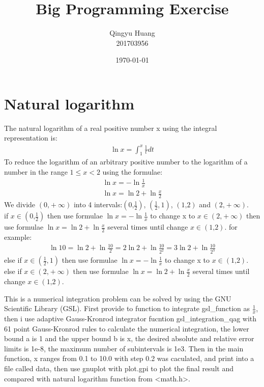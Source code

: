 \documentclass[oneside, 12pt, a4paper]{article}
\title{Big Programming Exercise}
\author{Qingyu Huang \\
201703956}
\date{\today}
\begin{document}
\maketitle

\section*{Natural logarithm}
%
The natural logarithm of a real positive number x using the integral representation is:
%
\begin{align}
    \ln x=\int_1^x{\frac{1}{t}dt}
\end{align}
%
To reduce the logarithm of an arbitrary positive number to the logarithm of a number in the range $1\leqslant x<2$ using the formulae:
%
\begin{align}
    \ln x=-\ln \frac{1}{x} \\
    \ln x=\ln 2+\ln \frac{x}{2}
\end{align}
We divide $(\text{0,}+\infty) $ into 4 intervals:$(\text{0,}\frac{1}{2}) $, $(\frac{1}{2},1) $, $(\text{1,}2) $ and $(\text{2,}+\infty)$.\\
if $x\in (\text{0,}\frac{1}{2})$ then use formulae $\ln x=-\ln \frac{1}{x}$ to change x to $x \in (\text{2,}+\infty) $ then use formulae $\ln x=\ln 2+\ln \frac{x}{2}$ several times until change $x \in (\text{1,}2) $. for example:
\begin{align}
    \ln 10=\ln 2+\ln \frac{10}{2}=  2\ln 2+\ln \frac{10}{2^2}=  3 \ln2 + \ln \frac{10}{2^3}
\end{align}
else if $x\in (\frac{1}{2},1)$ then use formulae $\ln x=-\ln \frac{1}{x}$ to change x to $x \in (\text{1,}2)$.\\
else if $x\in (\text{2,}+\infty)$ then use formulae $\ln x=\ln 2+\ln \frac{x}{2}$ several times until change $x \in (\text{1,}2) $.


This is a numerical integration problem can be solved by using the GNU Scientific Library (GSL). First provide to function to integrate gsl\_function as $\frac{1}{x}$, then i use adaptive Gauss-Kronrod integrator fucntion gsl\_integration\_qag with 61 point Gauss-Kronrod rules to calculate the numerical integration, the lower bound a is 1 and the upper bound b is x, the desired absolute and relative error limits is 1e-8, the maximum number of subintervals is 1e3. Then in the main function, x ranges from 0.1 to 10.0 with step 0.2 was caculated, and print into a file called data, then use gnuplot with plot.gpi to plot the final result and compared with natural logarithm function from <math.h>.
\end{document}
